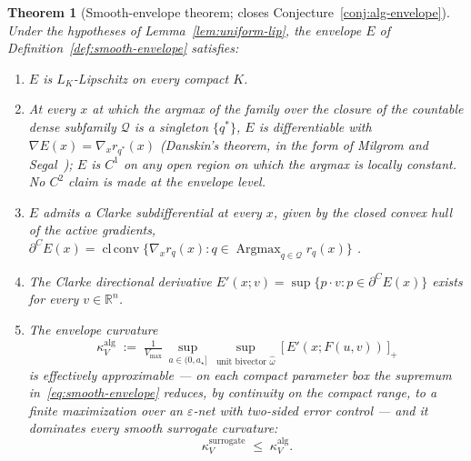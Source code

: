 \documentclass[11pt,a4paper]{article}
\theoremstyle{plain}
\newtheorem{theorem}{Theorem}[section]
\theoremstyle{definition}
\theoremstyle{remark}
\newcommand{\kk}{\kappa_{\!V}}
\newcommand{\RR}{\mathbb{R}}
\begin{document}
\begin{theorem}[Smooth-envelope theorem; closes
Conjecture~\ref{conj:alg-envelope}]
\label{thm:smooth-envelope}
Under the hypotheses of Lemma~\ref{lem:uniform-lip}, the envelope $E$
of Definition~\ref{def:smooth-envelope} satisfies:
\begin{enumerate}[leftmargin=*,itemsep=2pt]
\item[(a)] $E$ is $L_K$-Lipschitz on every compact $K$.
\item[(b)] At every $x$ at which the argmax of the family over the
  closure of the countable dense subfamily $\mathcal{Q}$ is a
  singleton $\{q^*\}$, $E$ is differentiable with $\nabla E(x) =
  \nabla_x r_{q^*}(x)$ (Danskin's theorem, in the form of Milgrom
  and Segal~\citep{milgromsegal2002}); $E$ is $C^1$ on any open
  region on which the
  argmax is locally constant. No $C^2$ claim is made at the envelope
  level.
\item[(c)] $E$ admits a Clarke subdifferential at every $x$, given
  by the closed convex hull of the active gradients,
  $\partial^{C}E(x) = \operatorname{cl\,conv}\bigl\{\nabla_x r_q(x) :
  q \in \operatorname{Argmax}_{q \in \mathcal{Q}} r_q(x)\bigr\}$
  \citep{clarke1975}.
\item[(d)] The Clarke directional derivative $E'(x; v) = \sup\{p
  \cdot v : p \in \partial^{C}E(x)\}$ exists for every
  $v \in \RR^{n}$.
\item[(e)] The envelope curvature
\begin{equation}\label{eq:kappa-alg}
  \kk^{\mathrm{alg}} \;:=\;
  \tfrac{1}{V_{\max}}\, \sup_{a \in (0, a_\star]}\,
  \sup_{\text{unit bivector } \hat\omega}\,
  \bigl[\,E'(x; F(u, v))\,\bigr]_+
\end{equation}
is effectively approximable --- on each compact parameter box the
supremum in~\eqref{eq:smooth-envelope} reduces, by continuity on
the compact range, to a finite maximization over an
$\varepsilon$-net with two-sided error control --- and it dominates
every smooth surrogate curvature:
\[
  \kk^{\mathrm{surrogate}} \;\leq\; \kk^{\mathrm{alg}}.
\]
\end{enumerate}
\end{theorem}
\end{document}

